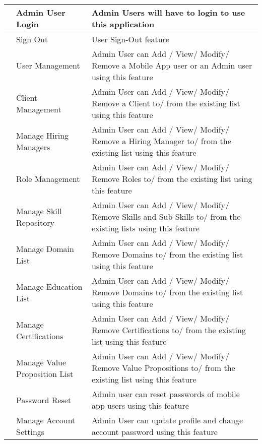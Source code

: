 \documentclass[hidelinks,a4paper]{article}
\begin{document}
\begin{center}
{\begin{tabularx}{\textwidth}{ | >{\ttfamily\raggedright\arraybackslash} s 
	 | >{\ttfamily\raggedright\arraybackslash} t 
     | >{\ttfamily\raggedright\arraybackslash} t | }
	 & Admin User Login & Admin Users will have to login to use this application  \\
	 & Sign Out & User Sign-Out feature  \\ [1em]
	 & User Management & Admin User can Add / View/ Modify/ Remove a Mobile App user or an Admin user using this feature  \\
	 & Client Management & Admin User can Add / View/ Modify/ Remove a Client to/ from the existing list using this feature   \\
	 & Manage Hiring Managers & Admin User can Add / View/ Modify/ Remove a Hiring Manager to/ from the existing list using this feature  \\
	 & Role Management & Admin User can Add / View/ Modify/ Remove Roles to/ from the existing list using this feature   \\ 
	 & Manage Skill Repository & Admin User can Add / View/ Modify/ Remove Skills and Sub-Skills to/ from the existing lists using this feature  \\
	 & Manage Domain List & Admin User can Add / View/ Modify/ Remove Domains to/ from the existing list using this feature \\
	 & Manage Education List & Admin User can Add / View/ Modify/ Remove Domains to/ from the existing list using this feature\\
	 & Manage Certifications  & Admin User can Add / View/ Modify/ Remove Certifications to/ from the existing list using this feature \\
	 & Manage Value Proposition List & Admin User can Add / View/ Modify/ Remove Value Propositions to/ from the existing list using this feature \\
	 & Password Reset & Admin user can reset passwords of mobile app users using this feature \\
	 & Manage Account Settings & Admin User can update profile and change account password using this feature \\
	\hline
	\end{tabularx} 
	}
	\end{center}
				
	\noindent
		
		
\end{document}
